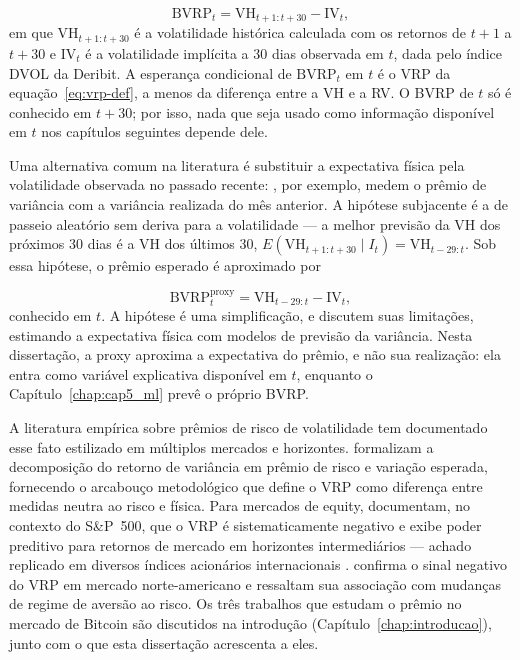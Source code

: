 \[
\text{BVRP}_t = \text{VH}_{t+1:t+30} - \text{IV}_t,
\]
em que $\text{VH}_{t+1:t+30}$ é a volatilidade histórica calculada com os
retornos de $t+1$ a $t+30$ e $\text{IV}_t$ é a volatilidade implícita a 30 dias
observada em $t$, dada pelo índice DVOL da Deribit. A esperança condicional de
$\text{BVRP}_t$ em $t$ é o VRP da equação~\eqref{eq:vrp-def}, a menos da
diferença entre a VH e a RV. O BVRP de $t$ só é conhecido em $t+30$; por isso,
nada que seja usado como informação disponível em $t$ nos capítulos seguintes
depende dele.

Uma alternativa comum na literatura é substituir a expectativa física pela
volatilidade observada no passado recente: \citet{bollerslev2009expected}, por
exemplo, medem o prêmio de variância com a variância realizada do mês
anterior. A hipótese subjacente é a de passeio aleatório sem deriva para a
volatilidade --- a melhor previsão da VH dos próximos 30 dias é a VH dos
últimos 30, $E(\text{VH}_{t+1:t+30} \mid I_t) = \text{VH}_{t-29:t}$. Sob essa
hipótese, o prêmio esperado é aproximado por

\[
\text{BVRP}^{\text{proxy}}_t = \text{VH}_{t-29:t} - \text{IV}_t,
\]
conhecido em $t$. A hipótese é uma simplificação, e \citet{bekaert2014vix}
discutem suas limitações, estimando a expectativa física com modelos de
previsão da variância. Nesta dissertação, a proxy aproxima a expectativa do
prêmio, e não sua realização: ela entra como variável explicativa disponível
em $t$, enquanto o Capítulo~\ref{chap:cap5_ml} prevê o próprio BVRP.

A literatura empírica sobre prêmios de risco de volatilidade tem documentado esse fato estilizado em múltiplos mercados e horizontes. \citet{carr2009variance} formalizam a decomposição do retorno de variância em prêmio de risco e variação esperada, fornecendo o arcabouço metodológico que define o VRP como diferença entre medidas neutra ao risco e física. Para mercados de equity, \citet{bollerslev2009expected} documentam, no contexto do S\&P~500, que o VRP é sistematicamente negativo e exibe poder preditivo para retornos de mercado em horizontes intermediários --- achado replicado em diversos índices acionários internacionais \citep{bollerslev2014international}. \citet{bali2009volatilitypremium} confirma o sinal negativo do VRP em mercado norte-americano e ressaltam sua associação com mudanças de regime de aversão ao risco. Os três trabalhos que estudam o prêmio no mercado de Bitcoin \citep{alexanderImeraj2019, almeida2024cryptoVRP, hoang2023cryptoVRP} são discutidos na introdução (Capítulo~\ref{chap:introducao}), junto com o que esta dissertação acrescenta a eles.


